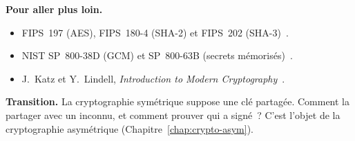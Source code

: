 \bigskip

\begin{boxinfo}
\textbf{Pour aller plus loin.}
\begin{itemize}
    \item FIPS~197 (AES), FIPS~180-4 (SHA-2) et FIPS~202
          (SHA-3)~\cite{fips197,fips1804,fips202}.
    \item NIST SP~800-38D (GCM) et SP~800-63B (secrets
          mémorisés)~\cite{nist80038d,nist80063b}.
    \item J.~Katz et Y.~Lindell, \emph{Introduction to Modern
          Cryptography}~\cite{katz2020}.
\end{itemize}
\end{boxinfo}

\begin{boxinfo}
\textbf{Transition.} La cryptographie symétrique suppose une clé
partagée. Comment la partager avec un inconnu, et comment prouver qui a
signé~? C'est l'objet de la cryptographie asymétrique
(Chapitre~\ref{chap:crypto-asym}).
\end{boxinfo}
